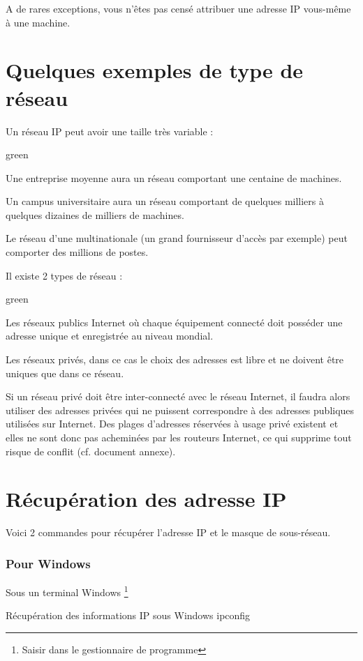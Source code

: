 {A de rares exceptions, vous n'êtes pas censé attribuer une adresse IP vous-même à une machine.\\


\section{Quelques exemples de type de réseau}

Un réseau IP peut avoir une taille très variable :

\begin{items}{green}{\Bullet}
	\item Une entreprise moyenne aura un réseau comportant une centaine de machines.
	\item Un campus universitaire aura un réseau comportant de quelques milliers à quelques dizaines de milliers de machines.
	\item Le réseau d'une multinationale (un grand fournisseur d'accès par exemple) peut comporter des millions de postes.
\end{items}


Il existe 2 types de réseau :

\begin{items}{green}{\Bullet}
\item Les réseaux publics Internet où chaque équipement connecté doit posséder une adresse unique et enregistrée au niveau mondial. 
\item Les réseaux privés, dans ce cas le choix des adresses est libre et ne doivent être uniques que dans ce réseau. 
\end{items}
Si un réseau privé doit être inter-connecté avec le réseau Internet, il faudra alors utiliser des adresses privées qui 
ne puissent correspondre à des adresses publiques utilisées sur Internet. Des plages d’adresses réservées à usage privé 
existent et elles ne sont donc pas acheminées par les routeurs Internet, ce qui supprime tout risque de conflit (cf. document annexe). 


\section{Récupération des adresse IP}

Voici 2 commandes pour récupérer l'adresse IP et le masque de sous-réseau.

\subsubsection{Pour Windows}
Sous un terminal Windows \footnote{Saisir  dans le gestionnaire de programme}
\begin{Bash}{Récupération des informations IP sous Windows}
ipconfig
\end{Bash}
	

}
